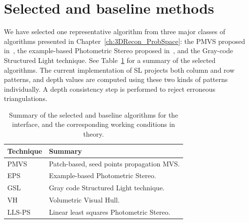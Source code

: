 
\section{Selected and baseline methods}
We have selected one representative algorithm from three major classes of algorithms presented in Chapter~\ref{ch:3DRecon_ProbSpace}: the PMVS proposed in~\cite{furukawa2010accurate}, the example-based Photometric Stereo proposed in~\cite{hertzmann2005example}, and the Gray-code Structured Light technique. See Table~\ref{tab:selected_algos} for a summary of the selected algorithms. The current implementation of SL projects both column and row patterns, and depth values are computed using these two kinds of patterns individually. A depth consistency step is performed to reject erroneous triangulations.
\begin{table}[!htbp]
\centering
\begin{tabular}{l|l}
\toprule
Technique & Summary\\
\midrule
PMVS & Patch-based, seed points propagation MVS.\\
EPS & Example-based Photometric Stereo.\\
GSL & Gray code Structured Light technique.\\
\midrule
VH & Volumetric Visual Hull.\\
LLS-PS & Linear least squares Photometric Stereo.\\
\bottomrule
\end{tabular}
\caption{Summary of the selected and baseline algorithms for the interface, and the corresponding working conditions in theory.}
\label{tab:selected_algos}
\end{table}

